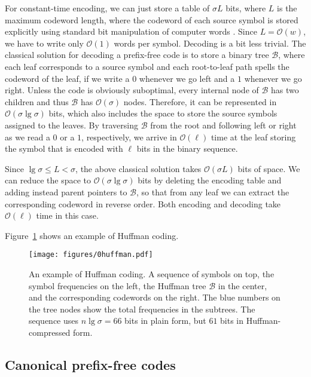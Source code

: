 \documentclass[preprint,12pt]{elsarticle}
\newcommand{\Oh}[1]{\ensuremath{\mathcal{O}\!\left({#1}\right)}}
\newcommand{\B}{\mathcal{B}}
\renewcommand{\log}{\lg}
\begin{document}
For constant-time encoding, we can just store a table of $\sigma L$ bits, where 
$L$ is the maximum codeword length, where the codeword of each source symbol is
stored explicitly using standard bit manipulation of computer words
\cite[Sec.\ 3.1]{Nav16}. Since $L=\Oh{w}$, we have to write only $\Oh{1}$
words per symbol. Decoding is a bit less trivial. The classical solution for
decoding a prefix-free code is to store a binary tree $\B$, where each leaf 
corresponds to a source symbol and each root-to-leaf path spells the codeword 
of the leaf, if we write a $0$ whenever we go left and a $1$ whenever we go 
right. Unless the code is obviously suboptimal, every internal node of $\B$ has
two children and thus $\B$ has $\Oh{\sigma}$ nodes. Therefore, it can be 
represented in $\Oh{\sigma\log\sigma}$ bits, which also includes the space to 
store the source symbols assigned to the leaves. By traversing $\B$ from the 
root and following left or right as we read a $0$ or a $1$, respectively, we 
arrive in $\Oh{\ell}$ time at the leaf storing the symbol that is encoded with 
$\ell$ bits in the binary sequence. 

Since $\log\sigma \le L < \sigma$, the above classical solution takes 
$\Oh{\sigma L}$ bits of space. We can reduce the space to 
$\Oh{\sigma\log\sigma}$ bits by deleting the encoding table and adding instead
parent pointers to $\B$, so that from any leaf we can extract the
corresponding codeword in reverse order. Both encoding and decoding take
$\Oh{\ell}$ time in this case.

Figure~\ref{fig:huffman} shows an example of Huffman coding.

\begin{figure}[t]
\begin{center}
\texttt{[image: figures/0huffman.pdf]}
\end{center}
\vspace*{-5mm}
\caption{An example of Huffman coding. A sequence of symbols on top, the 
symbol frequencies on the left, the Huffman tree $\B$ in the center, and
the corresponding codewords on the right. The blue numbers on the tree nodes
show the total frequencies in the subtrees. The sequence uses $n\lg\sigma = 66$
bits in plain form, but $61$ bits in Huffman-compressed form.}
\label{fig:huffman}
\end{figure}

\subsection{Canonical prefix-free codes}
\end{document}
